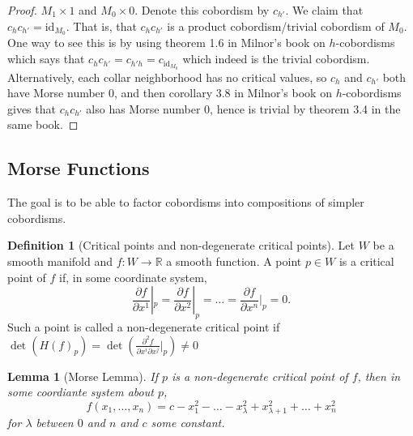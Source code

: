 \documentclass[reqno]{amsart}
\newtheorem{lemma}[theorem]{Lemma}
\theoremstyle{definition}
\newtheorem{definition}[theorem]{Definition}
\theoremstyle{remark}
\newcommand{\id}{{\mathrm{id}}}
\begin{document}
\begin{proof}
        $M_1 \times 1$ and $M_0 \times 0$. Denote this
        cobordism by $c_{h'}$.
        We claim that $c_{h} c_{h'} = \id_{M_0}$. That is, that
        $c_{h} c_{h'}$ is a product cobordism/trivial cobordism
        of $M_0$. One way to see this is
        by using theorem 1.6 in Milnor's book on $h$-cobordisms
        which says that
        $c_{h} c_{h'} = c_{h' h} = c_{\id_{M_0}}$ which indeed
        is the trivial cobordism.
        Alternatively, each collar neighborhood has no
        critical values, so 
        $c_h$ and $c_{h'}$ both have Morse number $0$, and
        then corollary 3.8 in Milnor's book on
        $h$-cobordisms gives that
        $c_h c_{h'}$ also has Morse number $0$, hence
        is trivial by theorem 3.4 in the same book.
    \end{proof}



    \newpage


    \subsection{Morse Functions}

    The goal is to be able to factor cobordisms into
    compositions of simpler cobordisms.

    \begin{definition}[Critical points and non-degenerate
        critical points]
        Let $W$ be a smooth manifold and
        $f \colon W \to \mathbb{R}$ a smooth function.
        A point $p \in W$ is a critical point of
        $f$ if, in some coordinate system,
        \[
        \frac{\partial f}{\partial x^{1}}|_{p} = 
        \frac{\partial f}{\partial x^2}|_{p} = \ldots 
        = \frac{\partial f}{\partial x^{n}}|_p = 0.
        \] 
        Such a point is called a non-degenerate critical
        point if $\det \left( H(f)_p \right) 
        = \det \left( \frac{\partial^2 f}{\partial x^{i}
        \partial x^{j}}|_p \right) \neq 0$
    \end{definition}

    \begin{lemma}[Morse Lemma]\label{Morse-Lemma}
        If $p$ is a non-degenerate critical point of
        $f$, then in some coordiante system about $p$,
        \[
        f\left( x_1, \ldots, x_n \right) =
        c - x_1^2 - \ldots - x_{\lambda}^2 +
        x_{\lambda+1}^2 + \ldots + x_{n}^2
        \] 
        for $\lambda$ between $0$ and $n$ and
        $c$ some constant.
    \end{lemma}
\end{document}
